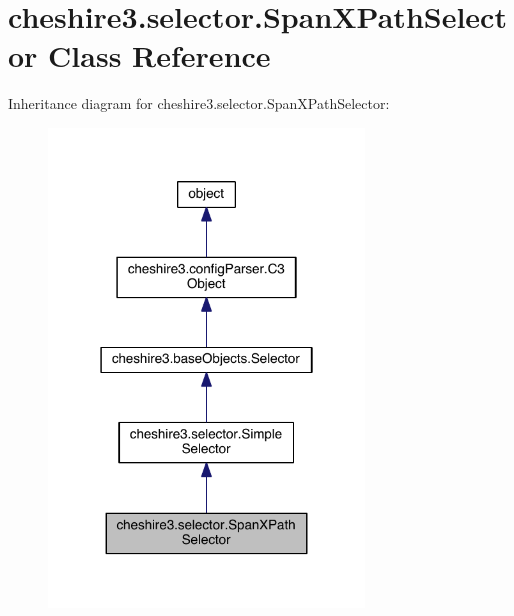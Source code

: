 \hypertarget{classcheshire3_1_1selector_1_1_span_x_path_selector}{\section{cheshire3.\-selector.\-Span\-X\-Path\-Selector Class Reference}
\label{classcheshire3_1_1selector_1_1_span_x_path_selector}
}


Inheritance diagram for cheshire3.\-selector.\-Span\-X\-Path\-Selector\-:
\nopagebreak
\begin{figure}[H]
\begin{center}
\leavevmode
\includegraphics[width=238pt]{classcheshire3_1_1selector_1_1_span_x_path_selector__inherit__graph}
\end{center}
\end{figure}


